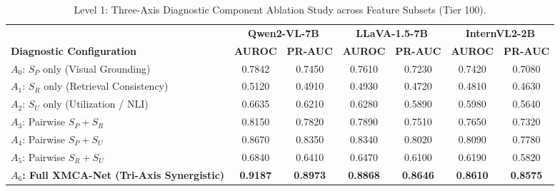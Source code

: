 \begin{table}[t]
\centering
\small
\caption{Level 1: Three-Axis Diagnostic Component Ablation Study across Feature Subsets (Tier 100).}
\label{tab:ablation_level1_features}
\begin{tabular}{lcccccc}
\toprule
 & \multicolumn{2}{c}{\textbf{Qwen2-VL-7B}} & \multicolumn{2}{c}{\textbf{LLaVA-1.5-7B}} & \multicolumn{2}{c}{\textbf{InternVL2-2B}} \\
\cmidrule(lr){2-3} \cmidrule(lr){4-5} \cmidrule(lr){6-7}
\textbf{Diagnostic Configuration} & \textbf{AUROC} & \textbf{PR-AUC} & \textbf{AUROC} & \textbf{PR-AUC} & \textbf{AUROC} & \textbf{PR-AUC} \\
\midrule
$A_0$: $S_P$ only (Visual Grounding) & 0.7842 & 0.7450 & 0.7610 & 0.7230 & 0.7420 & 0.7080 \\
$A_1$: $S_R$ only (Retrieval Consistency) & 0.5120 & 0.4910 & 0.4930 & 0.4720 & 0.4810 & 0.4630 \\
$A_2$: $S_U$ only (Utilization / NLI) & 0.6635 & 0.6210 & 0.6280 & 0.5890 & 0.5980 & 0.5640 \\
$A_3$: Pairwise $S_P + S_R$ & 0.8150 & 0.7820 & 0.7890 & 0.7510 & 0.7650 & 0.7320 \\
$A_4$: Pairwise $S_P + S_U$ & 0.8670 & 0.8350 & 0.8340 & 0.8020 & 0.8090 & 0.7780 \\
$A_5$: Pairwise $S_R + S_U$ & 0.6840 & 0.6410 & 0.6470 & 0.6100 & 0.6190 & 0.5820 \\
\textbf{$A_6$: Full XMCA-Net (Tri-Axis Synergistic)} & \textbf{0.9187} & \textbf{0.8973} & \textbf{0.8868} & \textbf{0.8646} & \textbf{0.8610} & \textbf{0.8575} \\
\bottomrule
\end{tabular}
\end{table}